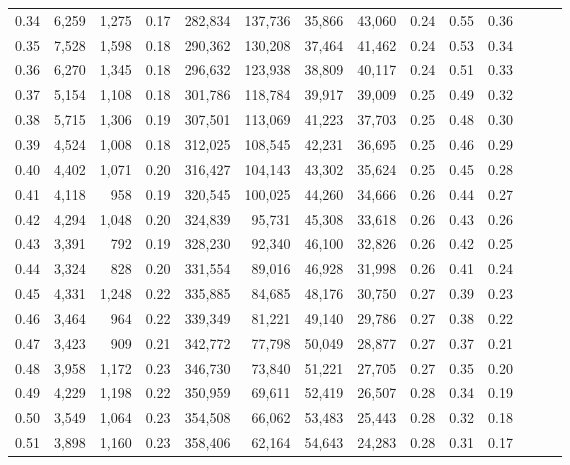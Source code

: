 \begin{tabular}{rrrrrrrrrrrrrr}
0.34 &   6,259 &  1,275 &  0.17 &  282,834 &  137,736 &  35,866 &  43,060 &  0.24 &  0.55 &      0.36 \\
0.35 &   7,528 &  1,598 &  0.18 &  290,362 &  130,208 &  37,464 &  41,462 &  0.24 &  0.53 &      0.34 \\
0.36 &   6,270 &  1,345 &  0.18 &  296,632 &  123,938 &  38,809 &  40,117 &  0.24 &  0.51 &      0.33 \\
0.37 &   5,154 &  1,108 &  0.18 &  301,786 &  118,784 &  39,917 &  39,009 &  0.25 &  0.49 &      0.32 \\
0.38 &   5,715 &  1,306 &  0.19 &  307,501 &  113,069 &  41,223 &  37,703 &  0.25 &  0.48 &      0.30 \\
0.39 &   4,524 &  1,008 &  0.18 &  312,025 &  108,545 &  42,231 &  36,695 &  0.25 &  0.46 &      0.29 \\
0.40 &   4,402 &  1,071 &  0.20 &  316,427 &  104,143 &  43,302 &  35,624 &  0.25 &  0.45 &      0.28 \\
0.41 &   4,118 &    958 &  0.19 &  320,545 &  100,025 &  44,260 &  34,666 &  0.26 &  0.44 &      0.27 \\
0.42 &   4,294 &  1,048 &  0.20 &  324,839 &   95,731 &  45,308 &  33,618 &  0.26 &  0.43 &      0.26 \\
0.43 &   3,391 &    792 &  0.19 &  328,230 &   92,340 &  46,100 &  32,826 &  0.26 &  0.42 &      0.25 \\
0.44 &   3,324 &    828 &  0.20 &  331,554 &   89,016 &  46,928 &  31,998 &  0.26 &  0.41 &      0.24 \\
0.45 &   4,331 &  1,248 &  0.22 &  335,885 &   84,685 &  48,176 &  30,750 &  0.27 &  0.39 &      0.23 \\
0.46 &   3,464 &    964 &  0.22 &  339,349 &   81,221 &  49,140 &  29,786 &  0.27 &  0.38 &      0.22 \\
0.47 &   3,423 &    909 &  0.21 &  342,772 &   77,798 &  50,049 &  28,877 &  0.27 &  0.37 &      0.21 \\
0.48 &   3,958 &  1,172 &  0.23 &  346,730 &   73,840 &  51,221 &  27,705 &  0.27 &  0.35 &      0.20 \\
0.49 &   4,229 &  1,198 &  0.22 &  350,959 &   69,611 &  52,419 &  26,507 &  0.28 &  0.34 &      0.19 \\
0.50 &   3,549 &  1,064 &  0.23 &  354,508 &   66,062 &  53,483 &  25,443 &  0.28 &  0.32 &      0.18 \\
0.51 &   3,898 &  1,160 &  0.23 &  358,406 &   62,164 &  54,643 &  24,283 &  0.28 &  0.31 &      0.17 \\

\end{tabular}
